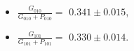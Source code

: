 \begin{itemize}
  \item $\frac{G_{010}}{G_{010} + P_{010}} =$ $0.341 \pm 0.015$,
  \item $\frac{G_{101}}{G_{101} + P_{101}} =$ $0.330 \pm 0.014$.
\end{itemize}
